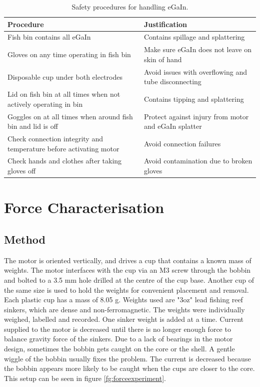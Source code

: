 \documentclass[a4paper,12pt]{article}
\begin{document}
\begin{table} [h!]
    \centering
    \caption{Safety procedures for handling eGaIn.}
    \label{tb:safety}
    \begin{tabular}{L | L}
        \hline
        \textbf{Procedure} & \textbf{Justification} \\ [0.5ex]
        \hline\hline
        Fish bin contains all eGaIn & Contains spillage and splattering \\
        \hline
        Gloves on any time operating in fish bin & Make sure eGaIn does not leave on skin of hand\\
        \hline
        Disposable cup under both electrodes & Avoid issues with overflowing and tube disconnecting \\
        \hline
        Lid on fish bin at all times when not actively operating in bin & Contains tipping and splattering \\
        \hline
        Goggles on at all times when around fish bin and lid is off & Protect against injury from motor and eGaIn splatter \\
        \hline
        Check connection integrity and temperature before activating motor & Avoid connection failures \\
        \hline
        Check hands and clothes after taking gloves off & Avoid contamination due to broken gloves \\
        \hline
    \end{tabular}
\end{table}

\newpage

\section{Force Characterisation}

\subsection{Method}

The motor is oriented vertically, and drives a cup that contains a known mass of weights. The motor interfaces with the cup via an M3 screw through the bobbin and bolted to a 3.5 mm hole drilled at the centre of the cup base. Another cup of the same size is used to hold the weights for convenient placement and removal. Each plastic cup has a mass of 8.05 g. Weights used are "3oz" lead fishing reef sinkers, which are dense and non-ferromagnetic. The weights were individually weighed, labelled and recorded. One sinker weight is added at a time. Current supplied to the motor is decreased until there is no longer enough force to balance gravity force of the sinkers. Due to a lack of bearings in the motor design, sometimes the bobbin gets caught on the core or the shell. A gentle wiggle of the bobbin usually fixes the problem. The current is decreased because the bobbin appears more likely to be caught when the cups are closer to the core. This setup can be seen in figure \ref{fg:forceexperiment}.
\end{document}
